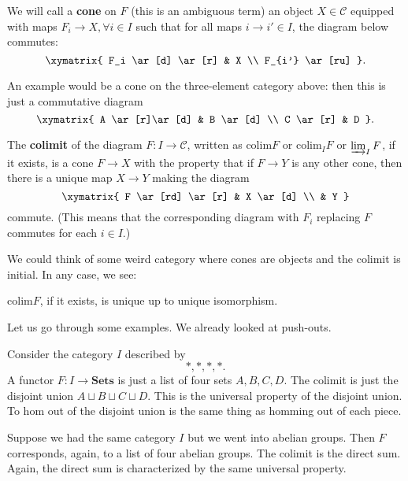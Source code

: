 We will call a \textbf{cone} on $F$ (this is an ambiguous term) an object $X
\in \mathcal{C}$ equipped with maps $F_i \to X, \forall i \in I$ such that for
all maps $i \to
i' \in I$, the diagram below commutes:
\[ \xymatrix{
F_i \ar[d] \ar[r] &  X \\
F_{i'} \ar[ru]
}.\]

An example would be a cone on the three-element category above: then
this is just a commutative diagram
\[ \xymatrix{
A \ar[r]\ar[d]  &  B \ar[d]  \\
C \ar[r] &  D
}.\]

\newcommand{\colim}{\mathrm{colim}}

\begin{definition}
The \textbf{colimit} of the diagram $F: I \to \mathcal{C}$, written as $\colim
F$ or $\colim_I F $ or $\varinjlim_I F$, if it exists, is a cone $F \to X$ with
the property that if $F \to Y$ is any other cone, then there is a unique map $X
\to Y$ making the diagram
\[ \xymatrix{
F  \ar[rd] \ar[r] &  X \ar[d]  \\
& Y
}\]
commute. (This means that the corresponding diagram with $F_i$ replacing $F$
commutes for each $i \in I$.)
\end{definition}

We could think of some weird category where cones are objects and the colimit
is initial. In any case, we see:

\begin{proposition}
$\colim F$, if it exists, is unique up to unique isomorphism.
\end{proposition}

Let us go through some examples. We already looked at push-outs.

\begin{example}
Consider the category $I$ described by
\[ \ast, \ast, \ast, \ast.  \]
A functor $F: I \to \mathbf{Sets}$ is just a list of four sets $A, B, C, D$.
The colimit is just the disjoint union $A \sqcup B \sqcup C \sqcup D$. This is
the universal property of the disjoint union. To hom out of the disjoint union
is the same thing as homming out of each piece.
\end{example}


\begin{example}
Suppose we had the same category $I$ but we went into abelian groups. Then $F$
corresponds, again, to a list of four abelian groups. The colimit is the direct
sum. Again, the direct sum is characterized by the same universal property.
\end{example}

